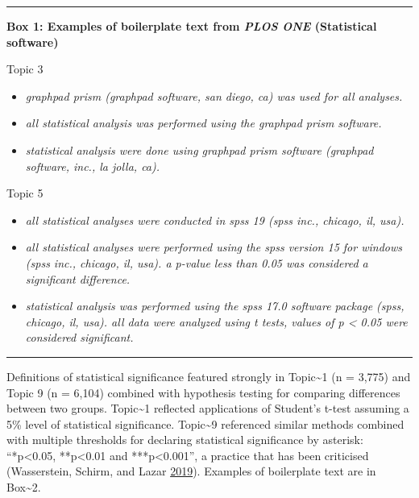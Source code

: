 \documentclass[
]{article}
\providecommand{\tightlist}{%
  \setlength{\itemsep}{0pt}\setlength{\parskip}{0pt}}
\begin{document}
\begin{center}\rule{0.5\linewidth}{0.5pt}\end{center}

\textbf{Box 1: Examples of boilerplate text from \emph{PLOS ONE} (Statistical software)}

Topic 3

\begin{itemize}
\tightlist
\item
  \emph{graphpad prism (graphpad software, san diego, ca) was used for all analyses.}
\item
  \emph{all statistical analysis was performed using the graphpad prism software.}
\item
  \emph{statistical analysis were done using graphpad prism software (graphpad software, inc., la jolla, ca).}
\end{itemize}

Topic 5

\begin{itemize}
\tightlist
\item
  \emph{all statistical analyses were conducted in spss 19 (spss inc., chicago, il, usa).}
\item
  \emph{all statistical analyses were performed using the spss version 15 for windows (spss inc., chicago, il, usa). a p-value less than 0.05 was considered a significant difference.}
\item
  \emph{statistical analysis was performed using the spss 17.0 software package (spss, chicago, il, usa). all data were analyzed using t tests, values of p \textless{} 0.05 were considered significant.}
\end{itemize}

\begin{center}\rule{0.5\linewidth}{0.5pt}\end{center}

Definitions of statistical significance featured strongly in Topic\textasciitilde1 (n = 3,775) and Topic 9 (n = 6,104) combined with hypothesis testing for comparing differences between two groups. Topic\textasciitilde1 reflected applications of Student's t-test assuming a 5\% level of statistical significance. Topic\textasciitilde9 referenced similar methods combined with multiple thresholds for declaring statistical significance by asterisk: ``*p\textless0.05, **p\textless0.01 and ***p\textless0.001'', a practice that has been criticised (Wasserstein, Schirm, and Lazar \protect\hyperlink{ref-Wasserstein2019}{2019}). Examples of boilerplate text are in Box\textasciitilde2.
\end{document}

